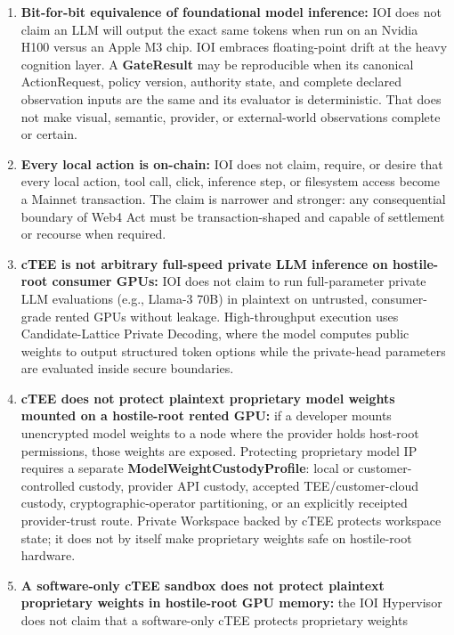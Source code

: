 \documentclass[
  11pt,
]{article}
\providecommand{\tightlist}{%
  \setlength{\itemsep}{0pt}\setlength{\parskip}{0pt}}
\begin{document}
\begin{enumerate}
\def\labelenumi{\arabic{enumi}.}
\tightlist
\item
  \textbf{Bit-for-bit equivalence of foundational model inference:} IOI
  does not claim an LLM will output the exact same tokens when run on an
  Nvidia H100 versus an Apple M3 chip. IOI embraces floating-point drift
  at the heavy cognition layer. A \textbf{GateResult} may be reproducible when
  its canonical ActionRequest, policy version, authority state, and complete
  declared observation inputs are the same and its evaluator is deterministic.
  That does not make visual, semantic, provider, or external-world observations
  complete or certain.
\item
  \textbf{Every local action is on-chain:} IOI does not claim, require,
  or desire that every local action, tool call, click, inference step,
  or filesystem access become a Mainnet transaction. The claim is
  narrower and stronger: any consequential boundary of Web4 Act must be
  transaction-shaped and capable of settlement or recourse when
  required.
\item
  \textbf{cTEE is not arbitrary full-speed private LLM inference on
  hostile-root consumer GPUs:} IOI does not claim to run full-parameter
  private LLM evaluations (e.g., Llama-3 70B) in plaintext on untrusted,
  consumer-grade rented GPUs without leakage. High-throughput execution
  uses Candidate-Lattice Private Decoding, where the model computes
  public weights to output structured token options while the
  private-head parameters are evaluated inside secure boundaries.
\item
  \textbf{cTEE does not protect plaintext proprietary model weights
  mounted on a hostile-root rented GPU:} if a developer mounts
  unencrypted model weights to a node where the provider holds host-root
  permissions, those weights are exposed. Protecting proprietary model
  IP requires a separate \textbf{ModelWeightCustodyProfile}: local or
  customer-controlled custody, provider API custody, accepted
  TEE/customer-cloud custody, cryptographic-operator partitioning, or an
  explicitly receipted provider-trust route. Private Workspace backed by
  cTEE protects workspace state; it does not by itself make proprietary
  weights safe on hostile-root hardware.
\item
  \textbf{A software-only cTEE sandbox does not protect plaintext
  proprietary weights in hostile-root GPU memory:} the IOI Hypervisor
  does not claim that a software-only cTEE protects proprietary weights

\end{enumerate}
\end{document}
